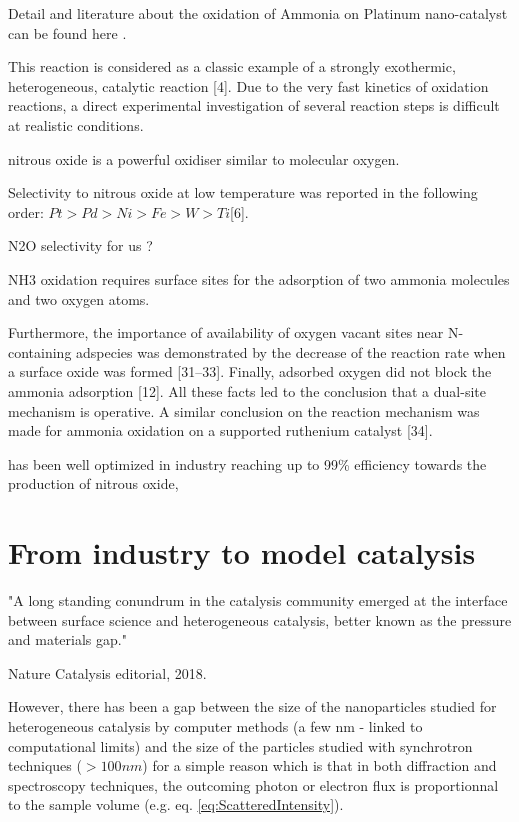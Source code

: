 Detail and literature about the oxidation of Ammonia on Platinum nano-catalyst can be found here \parencite{Resta2020a}.


This reaction is considered as a classic example of a strongly exothermic, heterogeneous, catalytic reaction [4].
Due to the very fast kinetics of oxidation reactions, a direct experimental investigation of several reaction steps is difficult at realistic conditions.

nitrous oxide is a powerful oxidiser similar to molecular oxygen.

Selectivity to nitrous oxide at low temperature was reported in the following order: $Pt > Pd > Ni > Fe > W > Ti $[6].

N2O selectivity for us ?

NH3 oxidation requires surface sites for the adsorption of two ammonia molecules and two oxygen atoms.

Furthermore, the importance of availability of oxygen vacant sites near N-containing adspecies was demonstrated by the decrease of the reaction rate when a surface oxide was formed [31–33].
Finally, adsorbed oxygen did not block the ammonia adsorption [12].
All these facts led to the conclusion that a dual-site mechanism is operative.
A similar conclusion on the reaction mechanism was made for ammonia oxidation on a supported ruthenium catalyst [34].

has been well optimized in industry reaching up to 99\% efficiency towards the production of nitrous oxide,

\section{From industry to model catalysis}

"A long standing conundrum in the catalysis community emerged at the interface between surface science and heterogeneous catalysis, better known as the pressure and materials gap."

Nature Catalysis editorial, 2018.


However, there has been a gap between the size of the nanoparticles studied for heterogeneous catalysis by computer methods (a few nm - linked to computational limits) and the size of the particles studied with synchrotron techniques ($>100 nm$) for a simple reason which is that in both diffraction and spectroscopy techniques, the outcoming photon or electron flux is proportionnal to the sample volume (e.g. eq. \ref{eq:ScatteredIntensity}).

